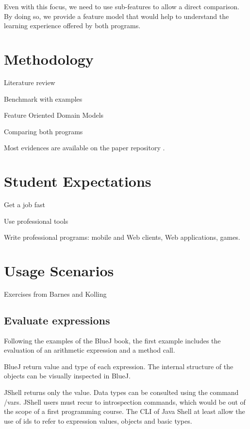 \documentclass{article}
\begin{document}
Even with this focus, we need to use sub-features to allow a direct comparison. By doing so, we provide a feature model that would help to understand the learning experience offered by both programs.




\section{Methodology}

Literature review

Benchmark with examples

Feature Oriented Domain Models

Comparing both programs


Most evidences are available on the paper repository \cite{mangan2025codepadjshell}.

\section{Student Expectations}

Get a job fast

Use professional tools

Write professional programs: mobile and Web clients, Web applications, games.

\section{Usage Scenarios}

Exercises from Barnes and Kolling

\subsection{Evaluate expressions}

Following the examples of the BlueJ book, the first example includes the evaluation of an arithmetic expression and a method call.

BlueJ return value and type of each expression. 
The internal structure of the objects can be visually inspected in BlueJ. 

JShell returns only the value. Data types can be consulted using the command /vars.
JShell users must recur to introspection commands, which would be out of the scope of a first programming course. 
The CLI of Java Shell at least allow the use of ids to refer to expression values,  objects  and basic types.
\end{document}
